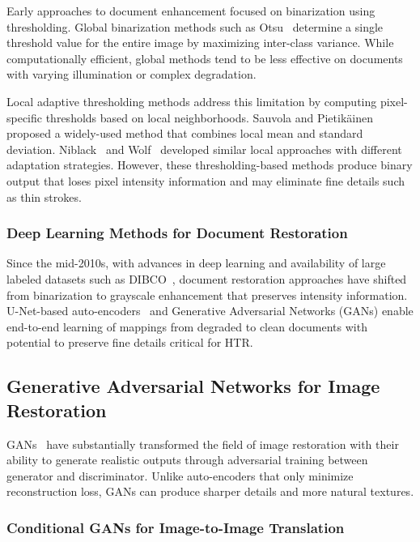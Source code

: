 \documentclass[journal]{IEEEtran}
\begin{document}
Early approaches to document enhancement focused on binarization using thresholding. Global binarization methods such as Otsu~\cite{otsu1979threshold} determine a single threshold value for the entire image by maximizing inter-class variance. While computationally efficient, global methods tend to be less effective on documents with varying illumination or complex degradation.

Local adaptive thresholding methods address this limitation by computing pixel-specific thresholds based on local neighborhoods. Sauvola and Pietikäinen~\cite{sauvola2000adaptive} proposed a widely-used method that combines local mean and standard deviation. Niblack~\cite{niblack1986introduction} and Wolf~\cite{wolf2004extraction} developed similar local approaches with different adaptation strategies. However, these thresholding-based methods produce binary output that loses pixel intensity information and may eliminate fine details such as thin strokes.

\subsubsection{Deep Learning Methods for Document Restoration}

Since the mid-2010s, with advances in deep learning and availability of large labeled datasets such as DIBCO~\cite{pratikakis2016hdibco}, document restoration approaches have shifted from binarization to grayscale enhancement that preserves intensity information. U-Net-based auto-encoders~\cite{ronneberger2015unet} and Generative Adversarial Networks (GANs) enable end-to-end learning of mappings from degraded to clean documents with potential to preserve fine details critical for HTR.

\subsection{Generative Adversarial Networks for Image Restoration}

GANs~\cite{goodfellow2016improved} have substantially transformed the field of image restoration with their ability to generate realistic outputs through adversarial training between generator and discriminator. Unlike auto-encoders that only minimize reconstruction loss, GANs can produce sharper details and more natural textures.

\subsubsection{Conditional GANs for Image-to-Image Translation}
\end{document}
